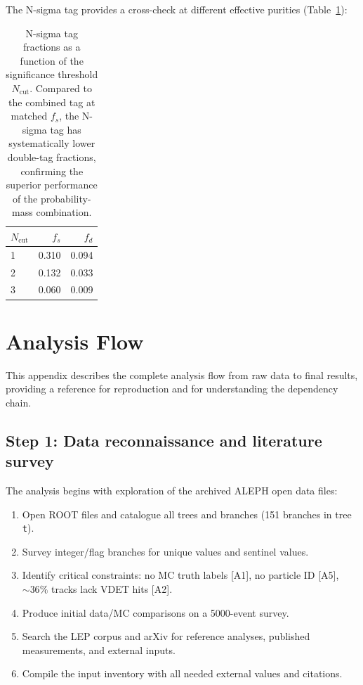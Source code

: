 \documentclass[11pt,a4paper]{article}
\begin{document}
The N-sigma tag provides a cross-check at different effective purities
(Table~\ref{tab:nsigma_fractions}):

\begin{table}[htbp]
\centering
\caption{N-sigma tag fractions as a function of the significance threshold $N_\mathrm{cut}$.
Compared to the combined tag at matched $f_s$, the N-sigma tag has systematically lower
double-tag fractions, confirming the superior performance of the probability-mass combination.}
\label{tab:nsigma_fractions}
\begin{tabular}{lrr}
\toprule
$N_\mathrm{cut}$ & $f_s$ & $f_d$ \\
\midrule
1 & 0.310 & 0.094 \\
2 & 0.132 & 0.033 \\
3 & 0.060 & 0.009 \\
\bottomrule
\end{tabular}
\end{table}

\section{Analysis Flow}
\label{app:analysis_flow}

This appendix describes the complete analysis flow from raw data to final results,
providing a reference for reproduction and for understanding the dependency chain.

\subsection{Step 1: Data reconnaissance and literature survey}

The analysis begins with exploration of the archived ALEPH open data files:
\begin{enumerate}
\item Open ROOT files and catalogue all trees and branches (151 branches in tree \texttt{t}).
\item Survey integer/flag branches for unique values and sentinel values.
\item Identify critical constraints: no MC truth labels [A1], no particle ID [A5],
$\sim 36\%$ tracks lack VDET hits [A2].
\item Produce initial data/MC comparisons on a 5000-event survey.
\item Search the LEP corpus and arXiv for reference analyses, published measurements,
and external inputs.
\item Compile the input inventory with all needed external values and citations.
\end{enumerate}
\end{document}
